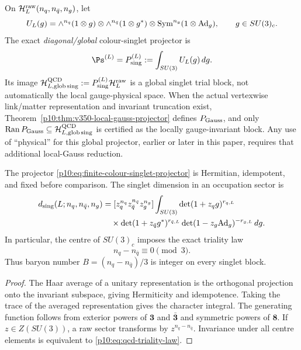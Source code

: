 \documentclass[12pt,a4paper]{article}
\begin{document}
\begin{definition}
\label{p10:def:finite-colour-singlet-projector}
On \(\mathcal H_{L}^{\rm raw}(n_q,n_{\bar q},n_g)\), let
\[
U_L(g)
=
\wedge^{n_q}(1\otimes g)
\otimes
\wedge^{n_{\bar q}}(1\otimes g^*)
\otimes
\operatorname{Sym}^{n_g}(1\otimes{\rm Ad}_g),
\qquad g\in SU(3)_c .
\]
The exact \emph{diagonal/global} colour-singlet projector is
\begin{equation}
\label{p10:eq:finite-colour-singlet-projector}
\Ps^{(L)}=P_{\rm sing}^{(L)}:=\int_{SU(3)}U_L(g)\,dg .
\end{equation}
Its image \(\mathcal H_{L,\rm glob\,sing}^{\rm QCD}:=P_{\rm sing}^{(L)}\mathcal H_L^{\rm raw}\) is a global singlet trial block, not automatically the local gauge-physical space. When the actual vertexwise link/matter representation and invariant truncation exist, Theorem~\ref{p10:thm:v350-local-gauss-projector} defines \(P_{\rm Gauss}\), and only \(\operatorname{Ran}P_{\rm Gauss}\subseteq\mathcal H_{L,\rm glob\,sing}^{\rm QCD}\) is certified as the locally gauge-invariant block. Any use of ``physical'' for this global projector, earlier or later in this paper, requires that additional local-Gauss reduction.
\end{definition}

\begin{theorem}
\label{p10:thm:finite-colour-singlet-basis-transcript}
The projector \eqref{p10:eq:finite-colour-singlet-projector} is Hermitian, idempotent, and fixed before comparison.  The singlet dimension in an occupation sector is
\begin{equation}
\label{p10:eq:singlet-dimension-character-formula}
\begin{aligned}
d_{\rm sing}(L;n_q,n_{\bar q},n_g)
&=[z_q^{n_q}z_{\bar q}^{n_{\bar q}}z_g^{n_g}]
\int_{SU(3)}
\det(1+z_q g)^{r_{q,L}}\\
&\quad\times
\det(1+z_{\bar q}g^*)^{r_{\bar q,L}}
\det(1-z_g{\rm Ad}_g)^{-r_{g,L}}\,dg .
\end{aligned}
\end{equation}
In particular, the centre of \(SU(3)_c\) imposes the exact triality law
\begin{equation}
\label{p10:eq:qcd-triality-law}
n_q-n_{\bar q}\equiv0\pmod 3 .
\end{equation}
Thus baryon number \(B=(n_q-n_{\bar q})/3\) is integer on every singlet block.
\end{theorem}
\begin{proof}
The Haar average of a unitary representation is the orthogonal projection onto the invariant subspace, giving Hermiticity and idempotence.  Taking the trace of the averaged representation gives the character integral.  The generating function follows from exterior powers of \(\mathbf 3\) and \(\bar{\mathbf 3}\) and symmetric powers of \(\mathbf 8\).  If \(z\in Z(SU(3))\), a raw sector transforms by \(z^{n_q-n_{\bar q}}\).  Invariance under all centre elements is equivalent to \eqref{p10:eq:qcd-triality-law}.
\end{proof}
\end{document}
